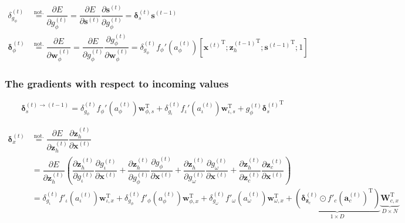 \documentclass[11pt]{article}
\begin{document}
\begin{align}
  \delta_{g_{\phi}}^{(t)}
  & \overset{\text{not.}}{=}
    \dfrac{\partial E}{\partial g_{\phi}^{(t)}} =
    \dfrac{\partial E}{\partial \mathbf{s}^{(t)}}
    \dfrac{\partial \mathbf{s}^{(t)}}{\partial g_{\phi}^{(t)}} =
    \boldsymbol{\delta}_s^{(t)} \mathbf{s}^{(t-1)}
  \\
  \boldsymbol{\delta}_{\phi}^{(t)} &\overset{\text{not.}}{=} \dfrac{\partial E}{\partial \boldsymbol{w}_{\phi}^{(t)}} = \dfrac{\partial E}{\partial g_{\phi}^{(t)}} \dfrac{\partial g_{\phi}^{(t)}}{\partial \boldsymbol{w}_{\phi}^{(t)}} = \delta_{g_{\phi}}^{(t)} f_{\phi}'\left(a_{\phi}^{(t)}\right) \left[{\mathbf{x}^{(t)}}^{\text{T}}; {\mathbf{z}_{h}^{(t-1)}}^{\text{T}}; {\mathbf{s}^{(t-1)}}^{\text{T}}; 1\right]
\end{align}

\subsubsection*{The gradients with respect to incoming values}

\begin{equation}
  \label{eq:grad_s_t_t_minus_1}
  \boldsymbol{\delta}^{(t) \rightarrow (t-1)}_s = 
  \delta_{g_{\phi}}^{(t)}f_{\phi}'\left(a_{\phi}^{(t)}\right)\mathbf{w}_{\phi,
    s}^{\text{T}} +
  \delta_{g_{\iota}}^{(t)}f_{\iota}'\left(a_{\iota}^{(t)}\right)\mathbf{w}_{\iota,
    s}^{\text{T}} +
  g_{\phi}^{(t)}{\boldsymbol{\delta}_{s}^{(t)}}^{\text{T}}
\end{equation}

\begin{equation}
  \begin{split}
    \boldsymbol{\delta}_x^{(t)}
    & \overset{\text{not.}}{=}
    \dfrac{\partial E}{\partial \mathbf{z}_h^{(t)}} \dfrac{\partial
      \mathbf{z}_h^{(t)}}{\partial \mathbf{x}^{(t)}}
    \\
    & =
    \dfrac{\partial E}{\partial \mathbf{z}_h^{(t)}}
    \left(
      \dfrac{\partial \mathbf{z}_h^{(t)}}{\partial g_{\iota}^{(t)}}
      \dfrac{\partial g_{\iota}^{(t)}}{\partial \mathbf{x}^{(t)}}
      +
      \dfrac{\partial \mathbf{z}_h^{(t)}}{\partial g_{\phi}^{(t)}}
      \dfrac{\partial g_{\phi}^{(t)}}{\partial \mathbf{x}^{(t)}}
      +
      \dfrac{\partial \mathbf{z}_h^{(t)}}{\partial g_{\omega}^{(t)}}
      \dfrac{\partial g_{\omega}^{(t)}}{\partial \mathbf{x}^{(t)}}
      +
      \dfrac{\partial \mathbf{z}_h^{(t)}}{\partial \mathbf{z}_{c}^{(t)}}
      \dfrac{\partial \mathbf{z}_{c}^{(t)}}{\partial \mathbf{x}^{(t)}}
    \right)
    \\
    & =
    \delta_{g_{\iota}}^{(t)} f'_{\iota}\left(a_{\iota}^{(t)}\right)
    \mathbf{w}_{\iota, x}^{\text{T}} + \delta_{g_{\phi}}^{(t)}
    f'_{\phi}\left(a_{\phi}^{(t)}\right) \mathbf{w}_{\phi, x}^{\text{T}} +
    \delta_{g_{\omega}}^{(t)} f'_{\omega}\left(a_{\omega}^{(t)}\right)
    \mathbf{w}_{\omega, x}^{\text{T}} + \underbrace{\left(\boldsymbol{\delta}_{\mathbf{z}_c}^{(t)} \odot
        {f'_{c}\left(\mathbf{a}_{c}^{(t)}\right)}^{\text{T}}\right)}_{1 \times D} \underbrace{\mathbf{W}_{c, x}^{\text{T}}}_{D \times N}
  \end{split}
\end{equation}
\end{document}
